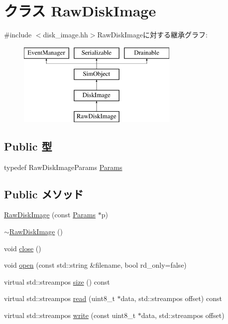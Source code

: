 \hypertarget{classRawDiskImage}{
\section{クラス RawDiskImage}
\label{classRawDiskImage}
}


{\ttfamily \#include $<$disk\_\-image.hh$>$}RawDiskImageに対する継承グラフ:\begin{figure}[H]
\begin{center}
\leavevmode
\includegraphics[height=4cm]{classRawDiskImage}
\end{center}
\end{figure}
\subsection*{Public 型}
\begin{DoxyCompactItemize}
\item 
typedef RawDiskImageParams \hyperlink{classRawDiskImage_af714565806621f1401c71701d4c88e71}{Params}
\end{DoxyCompactItemize}
\subsection*{Public メソッド}
\begin{DoxyCompactItemize}
\item 
\hyperlink{classRawDiskImage_a945e6d30a2216c70e181eb80cf249d52}{RawDiskImage} (const \hyperlink{classRawDiskImage_af714565806621f1401c71701d4c88e71}{Params} $\ast$p)
\item 
\hyperlink{classRawDiskImage_a28b4c60baee37ef27cf858eeef06d632}{$\sim$RawDiskImage} ()
\item 
void \hyperlink{classRawDiskImage_a5ae591df94fc66ccb85cbb6565368bca}{close} ()
\item 
void \hyperlink{classRawDiskImage_ab55319ad8c062fa8b3b36096d8d62014}{open} (const std::string \&filename, bool rd\_\-only=false)
\item 
virtual std::streampos \hyperlink{classRawDiskImage_ac47c8c9bb5ae5fbfa7e05b464d3e20d4}{size} () const 
\item 
virtual std::streampos \hyperlink{classRawDiskImage_ab2e0b5adfb9d2c78b1e534efa2af6e45}{read} (uint8\_\-t $\ast$data, std::streampos offset) const 
\item 
virtual std::streampos \hyperlink{classRawDiskImage_aadff68e91a6ca912a1878d79af3d0692}{write} (const uint8\_\-t $\ast$data, std::streampos offset)
\end{DoxyCompactItemize}
